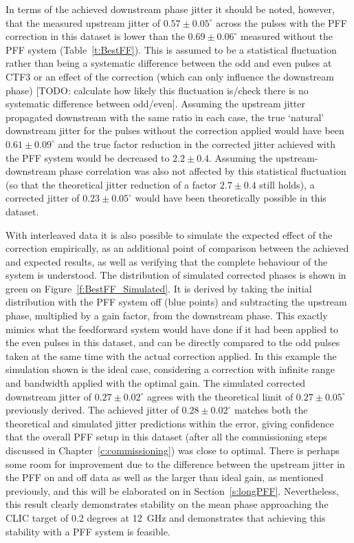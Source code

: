 In terms of the achieved downstream phase jitter it should be noted, however, that the measured upstream jitter of \(0.57\pm0.05^\circ\) across the pulses with the PFF correction in this dataset is lower than the \(0.69\pm0.06^\circ\) measured without the PFF system (Table~\ref{t:BestFF}). This is assumed to be a statistical fluctuation rather than being a systematic difference between the odd and even pulses at CTF3 or an effect of the correction (which can only influence the downstream phase) [TODO: calculate how likely this fluctuation is/check there is no systematic difference between odd/even]. Assuming the upstream jitter propagated downstream with the same ratio in each case, the true `natural' downstream jitter for the pulses without the correction applied would have been \(0.61\pm0.09^\circ\) and the true factor reduction in the corrected jitter achieved with the PFF system would be decreased to \(2.2\pm0.4\). Assuming the upstream-downstream phase correlation was also not affected by this statistical fluctuation (so that the theoretical jitter reduction of a factor \(2.7\pm0.4\) still holds), a corrected jitter of \(0.23\pm0.05^\circ\) would have been theoretically possible in this dataset.

With interleaved data it is also possible to simulate the expected effect of the correction empirically, as an additional point of comparison between the achieved and expected results, as well as verifying that the complete behaviour of the system is understood. The distribution of simulated corrected phases is shown in green on Figure~\ref{f:BestFF_Simulated}. It is derived by taking the initial distribution with the PFF system off (blue points) and subtracting the upstream phase, multiplied by a gain factor, from the downstream phase. This exactly mimics what the feedforward system would have done if it had been applied to the even pulses in this dataset, and can be directly compared to the odd pulses taken at the same time with the actual correction applied. In this example the simulation shown is the ideal case, considering a correction with infinite range and bandwidth applied with the optimal gain. The simulated corrected downstream jitter of \(0.27\pm0.02^\circ\) agrees with the theoretical limit of \(0.27\pm0.05^\circ\) previously derived. The achieved jitter of \(0.28\pm0.02^\circ\) matches both the theoretical and simulated jitter predictions within the error, giving confidence that the overall PFF setup in this dataset (after all the commissioning steps discussed in Chapter~\ref{c:commissioning}) was close to optimal. There is perhaps some room for improvement due to the difference between the upstream jitter in the PFF on and off data as well as the larger than ideal gain, as mentioned previously, and this will be elaborated on in Section~\ref{s:longPFF}. Nevertheless, this result clearly demonstrates stability on the mean phase approaching the CLIC target of 0.2 degrees at 12~GHz and demonstrates that achieving this stability with a PFF system is feasible.


